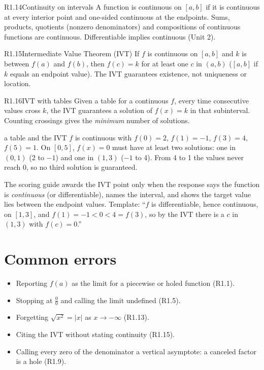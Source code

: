 \documentclass{apcalc}
\begin{document}
\begin{rulebox}{R1.14}{Continuity on intervals}
A function is continuous on $[a,b]$ if it is continuous at every interior point and one-sided continuous at the endpoints. Sums, products, quotients (nonzero denominators) and compositions of continuous functions are continuous. Differentiable implies continuous (Unit 2).
\end{rulebox}

\begin{rulebox}{R1.15}{Intermediate Value Theorem (IVT)}
If $f$ is continuous on $[a,b]$ and $k$ is between $f(a)$ and $f(b)$, then $f(c)=k$ for at least one $c$ in $(a,b)$ ($[a,b]$ if $k$ equals an endpoint value). The IVT guarantees existence, not uniqueness or location.
\end{rulebox}

\begin{rulebox}{R1.16}{IVT with tables}
Given a table for a continuous $f$, every time consecutive values cross $k$, the IVT guarantees a solution of $f(x)=k$ in that subinterval. Counting crossings gives the \emph{minimum} number of solutions.
\end{rulebox}

\begin{example}{a table and the IVT}
$f$ is continuous with $f(0)=2$, $f(1)=-1$, $f(3)=4$, $f(5)=1$. On $[0,5]$, $f(x)=0$ must have at least two solutions: one in $(0,1)$ (2 to $-1$) and one in $(1,3)$ ($-1$ to 4). From 4 to 1 the values never reach 0, so no third solution is guaranteed.
\end{example}

\begin{frqtip}
The scoring guide awards the IVT point only when the response says the function is \emph{continuous} (or differentiable), names the interval, and shows the target value lies between the endpoint values. Template: ``$f$ is differentiable, hence continuous, on $[1,3]$, and $f(1)=-1<0<4=f(3)$, so by the IVT there is a $c$ in $(1,3)$ with $f(c)=0$.''
\end{frqtip}

\section{Common errors}
\begin{itemize}
\item Reporting $f(a)$ as the limit for a piecewise or holed function (R1.1).
\item Stopping at $\tfrac00$ and calling the limit undefined (R1.5).
\item Forgetting $\sqrt{x^2}=|x|$ as $x\to-\infty$ (R1.13).
\item Citing the IVT without stating continuity (R1.15).
\item Calling every zero of the denominator a vertical asymptote: a canceled factor is a hole (R1.9).
\end{itemize}
\end{document}
